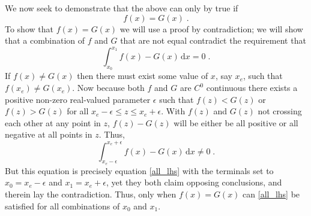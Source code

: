 \documentclass[12pt]{scrartcl}
\newcommand{\dx}[1]{\ensuremath{\,\mathrm{d}#1}}
\begin{document}
We now seek to demonstrate that the above can only by true if
\[ f(x) = G(x) \; . \]
To show that $f(x) = G(x)$ we will use a proof by contradiction; we will show that a combination of $f$ and $G$ that are not equal contradict the requirement that
\[ \int^{x_1}_{x_0} f(x) - G(x) \dx{x} = 0 \; . \]
If $f(x) \ne G(x)$ then there must exist some value of $x$, say $x_e$, such that $f(x_e) \ne G(x_e)$. Now because both $f$ and $G$ are $C^0$ continuous there exists a positive non-zero real-valued parameter $\epsilon$ such that $f(z) < G(z)$ or $f(z) > G(z)$ for all $x_e - \epsilon \le z \le x_e + \epsilon$. With $f(z)$ and $G(z)$ not crossing each other at any point in $z$, $f(z) - G(z)$ will be either be all positive or all negative at all points in $z$. Thus,
\[ \int_{x_e - \epsilon}^{x_e + \epsilon} f(x) - G(x) \dx{x} \ne 0 \; . \]
But this equation is precisely equation \eqref{all_lhs} with the terminals set to $x_0 = x_e - \epsilon$ and $x_1 = x_e + \epsilon$, yet they both claim opposing conclusions, and therein lay the contradiction. Thus, only when $f(x) = G(x)$ can \eqref{all_lhs} be satisfied for all combinations of $x_0$ and $x_1$.
\end{document}
